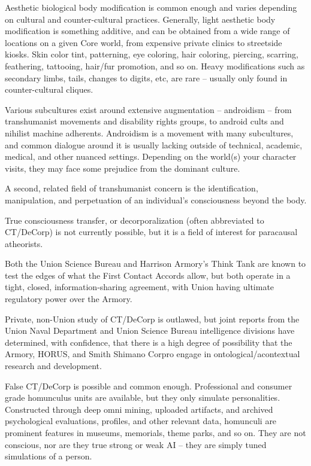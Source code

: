 Aesthetic biological body modification is common enough and varies depending on cultural and  
counter-cultural practices. Generally, light aesthetic body modification is something additive, and  
can be obtained from a wide range of locations on a given Core world, from expensive private  
clinics to streetside kiosks. Skin color tint, patterning, eye coloring, hair coloring, piercing,  
scarring, feathering, tattooing, hair/fur promotion, and so on. Heavy modifications such as  
secondary limbs, tails, changes to digits, etc, are rare -- usually only found in counter-cultural  
cliques.   
 

Various subcultures exist around extensive augmentation -- androidism -- from transhumanist  
movements and disability rights groups, to android cults and nihilist machine adherents.  
Androidism is a movement with many subcultures, and common dialogue around it is usually  
lacking outside of technical, academic, medical, and other nuanced settings. Depending on the  
world(s) your character visits, they may face some prejudice from the dominant culture. 
 

A second, related field of transhumanist concern is the identification, manipulation, and  
perpetuation of an individual’s consciousness beyond the body.   
 

True consciousness transfer, or decorporalization (often abbreviated to CT/DeCorp) is not  
currently possible, but it is a field of interest for paracausal atheorists. 
 
Both the Union Science Bureau and Harrison Armory’s Think Tank are known to test the edges of  
what the First Contact Accords allow, but both operate in a tight, closed, information-sharing  
agreement, with Union having ultimate regulatory power over the Armory. 
 

Private, non-Union study of CT/DeCorp is outlawed, but joint reports from the Union Naval  
Department and Union Science Bureau intelligence divisions have determined, with confidence,  
that there is a high degree of possibility that the Armory, HORUS, and Smith Shimano Corpro  
engage in ontological/acontextual research and development.  
 

False CT/DeCorp is possible and common enough. Professional and consumer grade  
homunculus units are available, but they only simulate personalities. Constructed through deep  
omni mining, uploaded artifacts, and archived psychological evaluations, profiles, and other  
relevant data, homunculi are prominent features in museums, memorials, theme parks, and so  
on. They are not conscious, nor are they true strong or weak AI -- they are simply tuned  
simulations of a person. 
 


